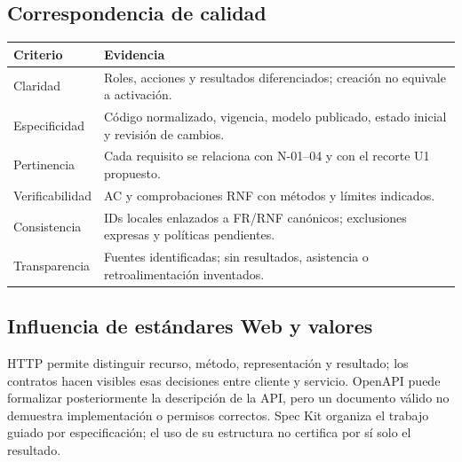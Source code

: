 \documentclass[11pt,a4paper]{article}
\begin{document}
\subsection{Correspondencia de
calidad}\label{correspondencia-de-calidad}

{\def\LTcaptype{none} %
\begin{longtable}[]{@{}
  >{\raggedright\arraybackslash}p{}
  >{\raggedright\arraybackslash}p{}@{}}
\toprule\noalign{}
\begin{minipage}[b]{\linewidth}\raggedright
Criterio
\end{minipage} & \begin{minipage}[b]{\linewidth}\raggedright
Evidencia
\end{minipage} \\
\midrule\noalign{}
\endhead
\bottomrule\noalign{}
\endlastfoot
Claridad & Roles, acciones y resultados diferenciados; creación no
equivale a activación. \\
Especificidad & Código normalizado, vigencia, modelo publicado, estado
inicial y revisión de cambios. \\
Pertinencia & Cada requisito se relaciona con N-01--04 y con el recorte
U1 propuesto. \\
Verificabilidad & 18 AC y comprobaciones RNF con métodos y límites
indicados. \\
Consistencia & IDs locales enlazados a FR/RNF canónicos; exclusiones
expresas y políticas pendientes. \\
Transparencia & Fuentes identificadas; sin resultados, asistencia o
retroalimentación inventados. \\
\end{longtable}
}

\subsection{Influencia de estándares Web y
valores}\label{influencia-de-estuxe1ndares-web-y-valores}

HTTP permite distinguir recurso, método, representación y resultado; los
contratos hacen visibles esas decisiones entre cliente y servicio.
OpenAPI puede formalizar posteriormente la descripción de la API, pero
un documento válido no demuestra implementación o permisos correctos.
Spec Kit organiza el trabajo guiado por especificación; el uso de su
estructura no certifica por sí solo el resultado.
\end{document}

